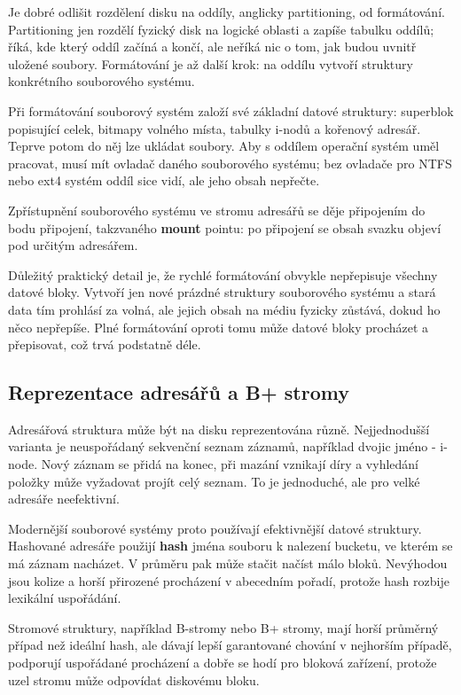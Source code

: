 Je dobré odlišit rozdělení disku na oddíly, anglicky partitioning, od formátování. Partitioning jen rozdělí fyzický disk na logické oblasti a zapíše tabulku oddílů; říká, kde který oddíl začíná a končí, ale neříká nic o tom, jak budou uvnitř uložené soubory. Formátování je až další krok: na oddílu vytvoří struktury konkrétního souborového systému.

Při formátování souborový systém založí své základní datové struktury: superblok popisující celek, bitmapy volného místa, tabulky i-nodů a kořenový adresář. Teprve potom do něj lze ukládat soubory. Aby s oddílem operační systém uměl pracovat, musí mít ovladač daného souborového systému; bez ovladače pro NTFS nebo ext4 systém oddíl sice vidí, ale jeho obsah nepřečte.

Zpřístupnění souborového systému ve stromu adresářů se děje připojením do bodu připojení, takzvaného \textbf{mount} pointu: po připojení se obsah svazku objeví pod určitým adresářem.

Důležitý praktický detail je, že rychlé formátování obvykle nepřepisuje všechny datové bloky. Vytvoří jen nové prázdné struktury souborového systému a stará data tím prohlásí za volná, ale jejich obsah na médiu fyzicky zůstává, dokud ho něco nepřepíše. Plné formátování oproti tomu může datové bloky procházet a přepisovat, což trvá podstatně déle.

\subsection*{Reprezentace adresářů a B+ stromy}

Adresářová struktura může být na disku reprezentována různě. Nejjednodušší varianta je neuspořádaný sekvenční seznam záznamů, například dvojic jméno - i-node. Nový záznam se přidá na konec, při mazání vznikají díry a vyhledání položky může vyžadovat projít celý seznam. To je jednoduché, ale pro velké adresáře neefektivní.

Modernější souborové systémy proto používají efektivnější datové struktury. Hashované adresáře použijí \textbf{hash} jména souboru k nalezení bucketu, ve kterém se má záznam nacházet. V průměru pak může stačit načíst málo bloků. Nevýhodou jsou kolize a horší přirozené procházení v abecedním pořadí, protože hash rozbije lexikální uspořádání.

Stromové struktury, například B-stromy nebo B+ stromy, mají horší průměrný případ než ideální hash, ale dávají lepší garantované chování v nejhorším případě, podporují uspořádané procházení a dobře se hodí pro bloková zařízení, protože uzel stromu může odpovídat diskovému bloku.

